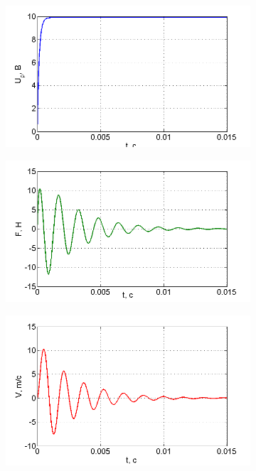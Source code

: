 \documentclass[a4paper, 12pt]{article}
\begin{document}
\newpage
\begin{figure}[h]
	\begin{subfigure}{0.5\textwidth}
		\centering
		\includegraphics[width=1.2\linewidth]{1}
		\caption{}
		\label{fig:1}
	\end{subfigure}
	\begin{subfigure}{0.5\textwidth}
		\centering
		\includegraphics[width=1.2\linewidth]{2}
		\caption{}
		\label{fig:2}
	\end{subfigure}
	\begin{subfigure}{0.5\textwidth}
		\centering
		\includegraphics[width=1.2\linewidth]{3}

\end{subfigure}
\end{figure}
\end{document}
